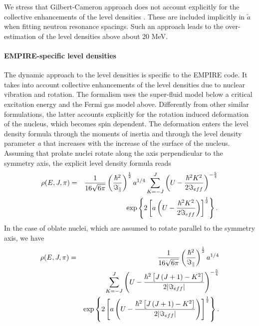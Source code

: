 We stress that Gilbert-Cameron approach does not account explicitly for the
collective enhancements of the level densities%
. These are included implicitly in $%
\widetilde{a}$ when fitting neutron resonance spacings. Such an approach
leads to the over-estimation of the level densities above about 20 MeV.

\medskip

\paragraph{EMPIRE-specific level densities}

The dynamic approach to the level densities%
 is specific to the EMPIRE code. It takes into
account collective enhancements of the level densities due to nuclear
vibration and rotation. The formalism uses the super-fluid model below a
critical excitation energy and the Fermi gas model above. Differently from
other similar formulations, the latter accounts explicitly for the
rotation induced deformation of the nucleus, which becomes spin dependent.
The deformation enters the level density formula through the moments of inertia
and through the level density parameter \emph{a} that increases with
the increase of the surface of the nucleus. Assuming that prolate nuclei
rotate along the axis perpendicular to the symmetry axis, the explicit level
density formula reads
\begin{eqnarray}
\rho(E,J,\pi) & = &
\frac{1}{16\sqrt{6\pi}}\left(\frac{\hbar^{2}}{\Im_{\Vert}}\right)^{\frac{1}{2%
}}a^{1/4}\sum_{K=-J}^{J}\left(U-\frac{\hbar^{2}K^{2}}{2\Im_{eff}}\right)^{-%
\frac{5}{4}}  \notag \\
& & \exp\left\{ 2\left[a\left(U-\frac{\hbar^{2}K^{2}}{2\Im_{eff}}\right)%
\right]^{\frac{1}{2}}\right\} .  \label{ro1}
\end{eqnarray}
In the case of oblate nuclei, which are assumed to rotate parallel to the
symmetry axis, we have
\begin{eqnarray}
\rho(E,J,\pi) & = & \frac{1}{16\sqrt{6\pi}}\left(\frac{\hbar^{2}}{\Im_{\Vert}%
}\right)^{\frac{1}{2}}a^{1/4}  \notag \\
& & \sum_{K=-J}^{J}\left(U-\frac{\hbar^{2}\left[J\left(J+1\right)-K^{2}%
\right]}{2|\Im_{eff}|}\right)^{-\frac{5}{4}}  \label{ro2} \\
& & \exp\left\{ 2\left[a\left(U-\frac{\hbar^{2}\left[J\left(J+1\right)-K^{2}%
\right]}{2|\Im_{eff}|}\right)\right]^{\frac{1}{2}}\right\} .  \notag
\end{eqnarray}
